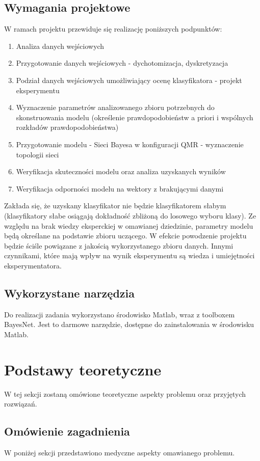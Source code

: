 \documentclass[12pt]{article}
\begin{document}
\subsection{Wymagania projektowe}
W ramach projektu przewiduje się realizację poniższych podpunktów:
\begin{enumerate}
	\item Analiza danych wejściowych
	\item Przygotowanie danych wejściowych - dychotomizacja, dyskretyzacja
	\item Podział danych wejściowych umożliwiający ocenę klasyfikatora - projekt eksperymentu
	\item Wyznaczenie parametrów analizowanego zbioru potrzebnych do skonstruowania modelu (określenie prawdopodobieństw a priori i wspólnych rozkładów prawdopodobieństwa)
	\item Przygotowanie modelu - Sieci Bayesa w konfiguracji QMR - wyznaczenie topologii sieci
	\item Weryfikacja skuteczności modelu oraz analiza uzyskanych wyników
	\item Weryfikacja odporności modelu na wektory z brakującymi danymi
\end{enumerate}

Zakłada się, że uzyskany klasyfikator nie będzie klasyfikatorem słabym (klasyfikatory słabe osiągają dokładność zbliżoną do losowego wyboru klasy). Ze względu na brak wiedzy eksperckiej w omawianej dziedzinie, parametry modelu będą określane na podstawie zbioru uczącego. W efekcie powodzenie projektu będzie ściśle powiązane z jakością wykorzystanego zbioru danych. Innymi czynnikami, które mają wpływ na wynik eksperymentu są wiedza i umiejętności eksperymentatora.

\subsection{Wykorzystane narzędzia}
Do realizacji zadania wykorzystano środowisko Matlab, wraz z toolboxem BayesNet. Jest to darmowe narzędzie, dostępne do zainstalowania w środowisku Matlab. 

\newpage
\section{Podstawy teoretyczne}
W tej sekcji zostaną omówione teoretyczne aspekty problemu oraz przyjętych rozwiązań.

\subsection{Omówienie zagadnienia}
W poniżej sekcji przedstawiono medyczne aspekty omawianego problemu.
\end{document}
